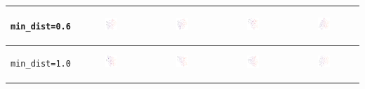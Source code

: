 \begin{tabular}{c|c|c|c|c}
	\hline
	\begin{sideways} \verb|min_dist=0.6| \end{sideways} & \includegraphics*[width = 0.2\textwidth]{min=0,6,n=6.png} & \includegraphics*[width = 0.2\textwidth]{min=0,6,n=7.png} & \includegraphics*[width = 0.2\textwidth]{min=0,6,n=8.png}
	& \includegraphics*[width = 0.2\textwidth]{min=0,6,n=9.png}\\
	\hline
	\begin{sideways} \verb|min_dist=1.0| \end{sideways} & \includegraphics*[width = 0.2\textwidth]{min=1,0,n=6.png} & \includegraphics*[width = 0.2\textwidth]{min=1,0,n=7.png} & \includegraphics*[width = 0.2\textwidth]{min=1,0,n=8.png} & \includegraphics*[width = 0.2\textwidth]{min=1,0,n=9.png}\\

\end{tabular}
